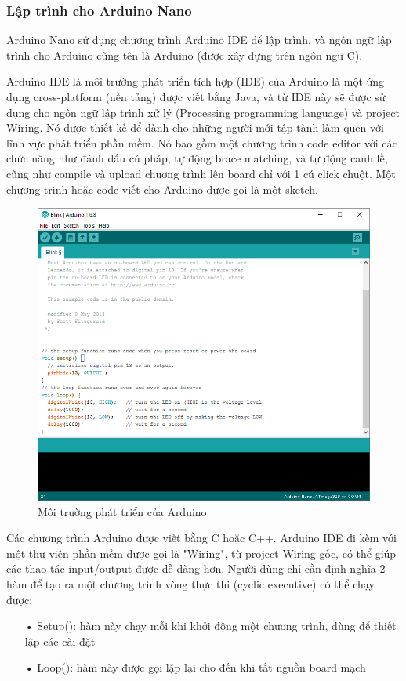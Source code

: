\subsubsection*{Lập trình cho Arduino Nano}
Arduino Nano sử dụng chương trình Arduino IDE để lập trình, và ngôn ngữ lập trình cho Arduino cũng tên là Arduino (được xây dựng trên ngôn ngữ C). 

Arduino IDE là môi trường phát triển tích hợp (IDE) của Arduino là một ứng dụng cross-platform (nền tảng) được viết bằng Java, và từ IDE này sẽ được sử dụng cho ngôn ngữ lập trình xử lý (Processing programming language) và project Wiring. Nó được thiết kế để dành cho những người mới tập tành làm quen với lĩnh vực phát triển phần mềm. Nó bao gồm một chương trình code editor với các chức năng như đánh dấu cú pháp, tự động brace matching, và tự động canh lề, cũng như compile và upload chương trình lên board chỉ với 1 cú click chuột. Một chương trình hoặc code viết cho Arduino được gọi là một sketch.

\begin{figure}[H]
\centering    
\includegraphics[width=1\textwidth]{arduinonano_ide}
\caption[Môi trường phát triển của Arduino]{Môi trường phát triển của Arduino}
\label{fig:arduinonano_ide}
\end{figure}

Các chương trình Arduino được viết bằng C hoặc C++. Arduino IDE đi kèm với một thư viện phần mềm được gọi là "Wiring", từ project Wiring gốc, có thể giúp các thao tác input/output được dễ dàng hơn. Người dùng chỉ cần định nghĩa 2 hàm để tạo ra một chương trình vòng thực thi (cyclic executive) có thể chạy được:
\begin{itemize}
\item[•]Setup(): hàm này chạy mỗi khi khởi động một chương trình, dùng để thiết lập
các cài đặt
\item[•]Loop(): hàm này được gọi lặp lại cho đến khi tắt nguồn board mạch
\end{itemize}

